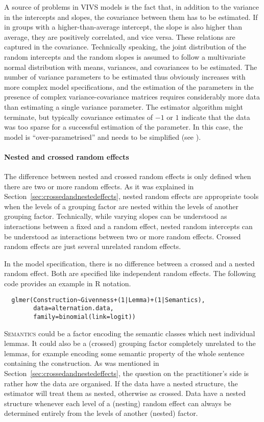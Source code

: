 A source of problems in VIVS models is the fact that, in addition to the variance in the intercepts and slopes, the covariance between them has to be estimated.
If in groups with a higher-than-average intercept, the slope is also higher than average, they are positively correlated, and vice versa.
These relations are captured in the covariance.
Technically speaking, the joint distribution of the random intercepts and the random slopes is assumed to follow a multivariate normal distribution with means, variances, and covariances to be estimated.
The number of variance parameters to be estimated thus obviously increases with more complex model specifications, and the estimation of the parameters in the presence of complex variance-covariance matrices requires considerably more data than estimating a single variance parameter.
The estimator algorithm might terminate, but typically covariance estimates of $-1$ or $1$ indicate that the data was too sparse for a successful estimation of the parameter.
In this case, the model is ``over-parametrised'' and needs to be simplified (see \citealt{BatesEa2015a,MatuschekEa2017}).

\paragraph{Nested and crossed random effects}

The difference between nested and crossed random effects is only defined when there are two or more random effects.
As it was explained in Section~\ref{sec:crossedandnestedeffects}, nested random effects are appropriate tools when the levels of a grouping factor are nested within the levels of another grouping factor.
Technically, while varying slopes can be understood as interactions between a fixed and a random effect, nested random intercepts can be understood as interactions between two or more random effects.
Crossed random effects are just several unrelated random effects.

In the model specification, there is no difference between a crossed and a nested random effect.
Both are specified like independent random effects.
The following code provides an example in R notation.

\begin{lstlisting}
  glmer(Construction~Givenness+(1|Lemma)+(1|Semantics),
        data=alternation.data,
        family=binomial(link=logit))
\end{lstlisting}

\textsc{Semantics} could be a factor encoding the semantic classes which nest individual lemmas.
It could also be a (crossed) grouping factor completely unrelated to the lemmas, for example encoding some semantic property of the whole sentence containing the construction.
As was mentioned in Section~\ref{sec:crossedandnestedeffects}, the question on the practitioner's side is rather how the data are organised.
If the data have a nested structure, the estimator will treat them as nested, otherwise as crossed.
Data have a nested structure whenever each level of a (nesting) random effect can always be determined entirely from the levels of another (nested) factor.


